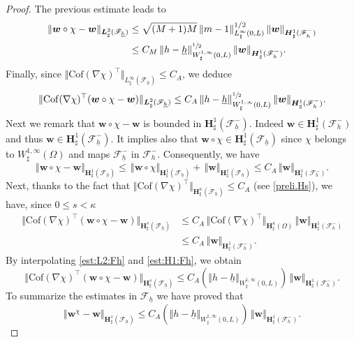 \documentclass[11pt]{article}
\let\mathcal\mathscr
\theoremstyle{remark}
\theoremstyle{definition}
\newcommand{\norme}[1]{\,\Vert #1\Vert}
\newcommand{\vnorme}[1]{\Vert #1\Vert}
\newcommand{\wg}{\boldsymbol{w}}
\newcommand{\BS}[1]{\boldsymbol{#1}}
\newcommand{\hb}{{\underline{h}}}
\newcommand{\Cof}{\mathrm{Cof}}
\begin{document}
\begin{proof}
The previous estimate leads to
\[
\begin{aligned}
\norme{\wg\circ\chi-\wg}_{\BS{L}^{2}_{\sharp}(\mathcal{F}_{\hb})}&{}\leq \sqrt{(M+1)M}\norme{m-1}_{L^{\infty}_{\sharp}(0,L)}^{1/2}\norme{\wg}_{\BS{H}^{1}_{\sharp}(\mathcal{F}_{h}^{-})}\nonumber\\
&\leq C_M\norme{h-\hb}_{W^{1,\infty}_{\sharp}(0,L)}^{\sfrac{1}{2}}\norme{\wg}_{\BS{H}^{1}_{\sharp}(\mathcal{F}_{h}^{-})}.
\end{aligned}
\]
Finally, since $\vnorme{\Cof(\nabla\chi)^{\top}}_{L^\infty_\sharp(\mathcal{F}_{\hb})}\leq C_A$, we deduce
\begin{equation}
\label{est:L2:Fh}
\norme{\Cof(\nabla\chi)^{\top}(\wg\circ\chi-\wg)}_{\BS{L}^{2}_{\sharp}(\mathcal{F}_{\hb})}\leq C_A\norme{h-\hb}_{W^{1,\infty}_{\sharp}(0,L)}^{\sfrac{1}{2}}\norme{\wg}_{\BS{H}^{1}_{\sharp}(\mathcal{F}_{h}^{-})}.
\end{equation}
Next we remark that $\wg\circ\chi - \wg$ is bounded in $\BS{H}_{\sharp}^1(\mathcal{F}^{-}_{\hb})$. Indeed $\wg\in \BS{H}_{\sharp}^1(\mathcal{F}^-_{h})$ and thus $\wg\in \BS{H}_{\sharp}^1(\mathcal{F}^{-}_{\hb})$. It implies also that $\wg\circ\chi \in \BS{H}_{\sharp}^1(\mathcal{F}_{\hb})$ since $\chi$ belongs to $W_{\sharp}^{1, \infty}(\Omega)$ and maps $\mathcal{F}^-_{\hb}$ in $\mathcal{F}^-_{h}$. Consequently, we have
\[
\norme{\wg\circ\chi - \wg}_{\BS{H}^{1}_{\sharp}(\mathcal{F}_{\hb})}\leq \norme{\wg\circ\chi}_{\BS{H}^{1}_{\sharp}(\mathcal{F}_{\hb})} + \norme{\wg}_{\BS{H}^{1}_{\sharp}(\mathcal{F}_{\hb})} \leq C_{A}\norme{\wg}_{\BS{H}^{1}_{\sharp}(\mathcal{F}^{-}_{h})}.
\]
Next, thanks to the fact that $\vnorme{\Cof(\nabla\chi)^{\top}}_{\BS{H}^\kappa_\sharp(\mathcal{F}_{\hb})}\leq C_A$ (see \eqref{preli.Hs}), we have, since $0\leq s<\kappa$
\begin{equation}
\begin{aligned}
\norme{\Cof(\nabla\chi)^{\top}(\wg\circ\chi - \wg)}_{\BS{H}^{s}_{\sharp}(\mathcal{F}_{\hb})}& \leq C_{A}{\norme{\Cof(\nabla\chi)^{\top}}_{\BS{H}^{\kappa}_{\sharp}(\Omega)}}\norme{\wg}_{\BS{H}^{1}_{\sharp}(\mathcal{F}^{-}_{h})} \\
& \leq C_{A}\norme{\wg}_{\BS{H}^{1}_{\sharp}(\mathcal{F}^{-}_{h})}.
\end{aligned}\label{est:H1:Fh}
\end{equation}
By interpolating \eqref{est:L2:Fh} and \eqref{est:H1:Fh}, we obtain
\[
\norme{\Cof(\nabla\chi)^{\top}(\wg\circ\chi - \wg)}_{\BS{H}^{s}_{\sharp}(\mathcal{F}_{\hb})}\leq C_A(\vnorme{h-\hb}_{W^{1,\infty}_{\sharp}(0,L)})\norme{\wg}_{\BS{H}^{1}_{\sharp}(\mathcal{F}^{-}_{h})}.
\]
To summarize the estimates in $\mathcal{F}_{\hb}$ we have proved that
\begin{equation} \label{eq.milieu}
\norme{\wg^\chi-\wg}_{\BS{H}^{s}_{\sharp}(\mathcal{F}_{\hb})}\leq C_A(\vnorme{h-\hb}_{W^{1,\infty}_{\sharp}(0,L)})\norme{\wg}_{\BS{H}^{1}_{\sharp}(\mathcal{F}^{-}_{h})}.
\end{equation}


\end{proof}
\end{document}
